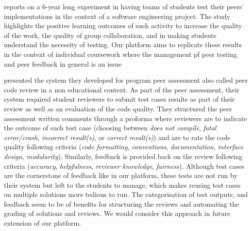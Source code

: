 \documentclass[sigplan,10pt,review]{acmart}\settopmatter{printfolios=true}
\begin{document}


\citet{Clark_ACE-2004} reports on a 6-year long experiment in having
teams of students test their peers' implementations in the context of
a software engineering project. The study highlights the positive
learning outcomes of such activity to increase the quality of the
work, the quality of group collaboration, and in making students
understand the necessity of testing. Our platform aims to replicate
these results in the context of individual coursework where the
management pf peer testing and peer feedback in general is an issue


\citet{ReiFinTer_Group-2009} presented the system they developed for
program peer assessment also called peer code review in a non
educational context. As part of the peer assessment, their system
required student reviewers to submit test cases results as part of
their review as well as an evaluation of the code quality. They
structured the peer assessment written comments through a proforma
where reviewers are to indicate the outcome of each test case
(choosing between \emph{does not compile}, \emph{fatal error/crash},
\emph{incorrect result(s)}, or \emph{correct result(s)}) and are to rate
the code quality following criteria (\emph{code formatting},
\emph{conventions}, \emph{documentation}, \emph{interface design},
\emph{modularity}). Similarly, feedback is provided back on the review
following criteria (\emph{accuracy}, \emph{helpfulness},
\emph{reviewer knowledge}, \emph{fairness}).
%
Although test cases are the cornerstone of feedback like in our
platform, these tests are not run by their system but left to the
students to manage, which makes reusing test cases on multiple
solutions more tedious to run. The categorisation of test outputs, and
feedback seem to be of benefits for structuring the reviews and
automating the grading of solutions and reviews. We would consider
this approach in future extension of our platform.
\end{document}
